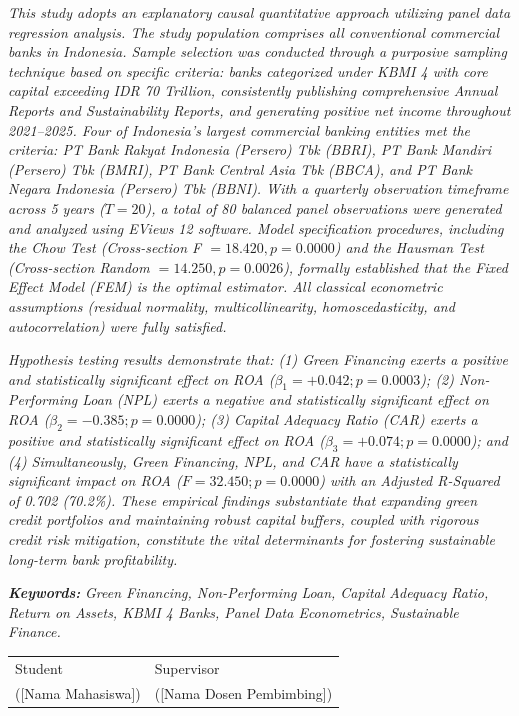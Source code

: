 \documentclass[12pt,a4paper]{article}
\newcommand{\nahamahasiswa}{[Nama Mahasiswa]}
\newcommand{\dosbim}{[Nama Dosen Pembimbing]}
\numberwithin{equation}{section}
\begin{document}
\noindent
\emph{This study adopts an explanatory causal quantitative approach utilizing panel data regression analysis. The study population comprises all conventional commercial banks in Indonesia. Sample selection was conducted through a purposive sampling technique based on specific criteria: banks categorized under KBMI 4 with core capital exceeding IDR 70 Trillion, consistently publishing comprehensive Annual Reports and Sustainability Reports, and generating positive net income throughout 2021--2025. Four of Indonesia's largest commercial banking entities met the criteria: PT Bank Rakyat Indonesia (Persero) Tbk (BBRI), PT Bank Mandiri (Persero) Tbk (BMRI), PT Bank Central Asia Tbk (BBCA), and PT Bank Negara Indonesia (Persero) Tbk (BBNI). With a quarterly observation timeframe across 5 years ($T=20$), a total of 80 balanced panel observations were generated and analyzed using EViews 12 software. Model specification procedures, including the Chow Test (Cross-section F $= 18.420, p = 0.0000$) and the Hausman Test (Cross-section Random $= 14.250, p = 0.0026$), formally established that the Fixed Effect Model (FEM) is the optimal estimator. All classical econometric assumptions (residual normality, multicollinearity, homoscedasticity, and autocorrelation) were fully satisfied.}

\noindent
\emph{Hypothesis testing results demonstrate that: (1) Green Financing exerts a positive and statistically significant effect on ROA ($\beta_1 = +0.042; p = 0.0003$); (2) Non-Performing Loan (NPL) exerts a negative and statistically significant effect on ROA ($\beta_2 = -0.385; p = 0.0000$); (3) Capital Adequacy Ratio (CAR) exerts a positive and statistically significant effect on ROA ($\beta_3 = +0.074; p = 0.0000$); and (4) Simultaneously, Green Financing, NPL, and CAR have a statistically significant impact on ROA ($F = 32.450; p = 0.0000$) with an Adjusted R-Squared of 0.702 (70.2\%). These empirical findings substantiate that expanding green credit portfolios and maintaining robust capital buffers, coupled with rigorous credit risk mitigation, constitute the vital determinants for fostering sustainable long-term bank profitability.}

\vspace{0.4cm}
\noindent
\textbf{\emph{Keywords:}} \emph{Green Financing, Non-Performing Loan, Capital Adequacy Ratio, Return on Assets, KBMI 4 Banks, Panel Data Econometrics, Sustainable Finance.}

\vspace{0.8cm}
\begin{tabular}{p{6cm} p{6cm}}
  Student & Supervisor \\[2.2cm]
  (\nahamahasiswa) & (\dosbim) \\
\end{tabular}
\end{document}
